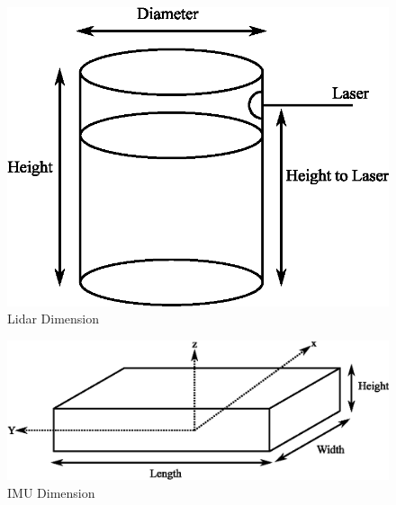 \begin{figure}[ht]
	\centering
	\includegraphics[scale=1]{images/imagess/3method-lidar.eps} 
	\caption{Lidar Dimension}
	\label{fig:Lidar Dimension}
\end{figure}

\begin{figure}[ht]
	\centering
	\includegraphics[scale=1]{images/imagess/3method-imu.eps} 
	\caption{IMU Dimension}
	\label{fig:IMU Dimension}
\end{figure}

